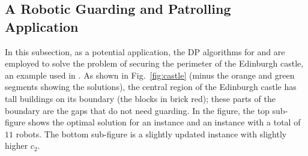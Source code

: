 \subsection{A Robotic Guarding and Patrolling Application}
In this subsection, as a potential application, the DP algorithms for 
\opglr and \opgmc are employed to solve the problem of securing the 
perimeter of the Edinburgh castle, an example used in 
\cite{FenHanGaoYu19RSS}. As shown in Fig.~\ref{fig:castle} (minus 
the orange and green segments showing the solutions), the central 
region of the Edinburgh castle has tall buildings on its boundary 
(the blocks in brick red); these parts of the boundary are the gaps 
that do not need guarding. In the figure, the top sub-figure shows 
the optimal solution for an \opglr instance and an \opgmc instance with 
a total of $11$ robots. The bottom sub-figure is a slightly updated 
\opgmc instance with slightly higher $c_2$. 
